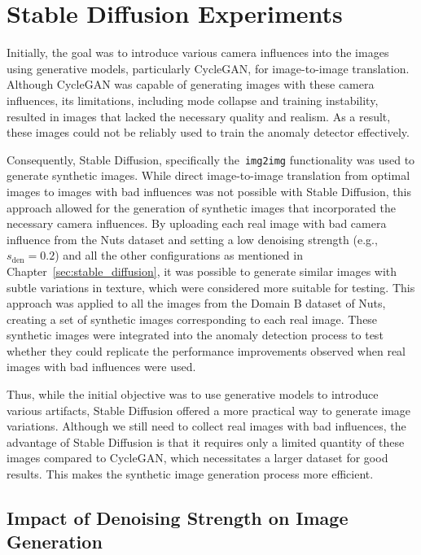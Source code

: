 \documentclass[12pt,DIV14,BCOR12mm,a4paper,footinclude=false,headinclude,parskip=half-,twoside,openright,cleardoublepage=empty,toc=index,bibliography=totoc,listof=totoc]{scrreprt}
\numberwithin{equation}{chapter}
\begin{document}
\section{Stable Diffusion Experiments}

Initially, the goal was to introduce various camera influences into the images using generative models, particularly CycleGAN, for image-to-image translation. Although CycleGAN was capable of generating images with these camera influences, its limitations, including mode collapse and training instability, resulted in images that lacked the necessary quality and realism. As a result, these images could not be reliably used to train the anomaly detector effectively.

Consequently, Stable Diffusion, specifically the~\texttt{img2img} functionality was used to generate synthetic images. While direct image-to-image translation from optimal images to images with bad influences was not possible with Stable Diffusion, this approach allowed for the generation of synthetic images that incorporated the necessary camera influences. By uploading each real image with bad camera influence from the Nuts dataset and setting a low denoising strength (e.g., $s_{\text{den}} = 0.2$) and all the other configurations as mentioned in Chapter~\ref{sec:stable_diffusion}, it was possible to generate similar images with subtle variations in texture, which were considered more suitable for testing. This approach was applied to all the images from the Domain B dataset of Nuts, creating a set of synthetic images corresponding to each real image. These synthetic images were integrated into the anomaly detection process to test whether they could replicate the performance improvements observed when real images with bad influences were used.

Thus, while the initial objective was to use generative models to introduce various artifacts, Stable Diffusion offered a more practical way to generate image variations. Although we still need to collect real images with bad influences, the advantage of Stable Diffusion is that it requires only a limited quantity of these images compared to CycleGAN, which necessitates a larger dataset for good results. This makes the synthetic image generation process more efficient.

\subsection{Impact of Denoising Strength on Image Generation}
\end{document}
